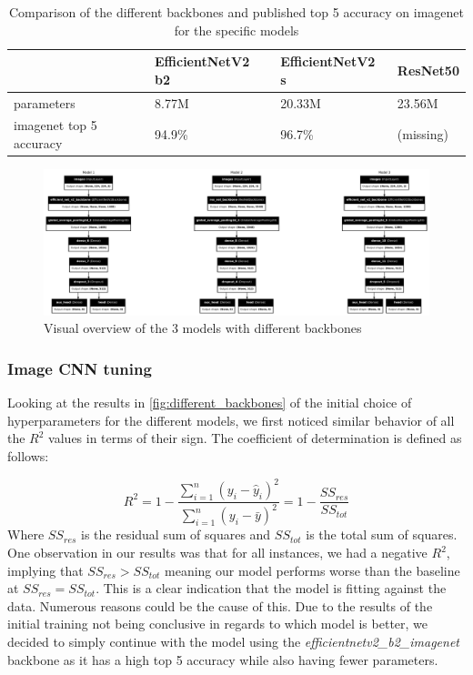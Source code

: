 \documentclass[12pt,a4paper,oneside]{article}
\begin{document}
\begin{table}[!h]
    \centering
    \begin{tabular}{@{}llll@{}}
    \toprule
    & EfficientNetV2 b2 & EfficientNetV2 s & ResNet50 \\ \midrule
    parameters              & 8.77M             & 20.33M           & 23.56M   \\
    imagenet top 5 accuracy & 94.9\%            & 96.7\%           & (missing)       \\ \bottomrule
\end{tabular}
\caption{Comparison of the different backbones and published top 5 accuracy on imagenet for the specific models}
\label{tab:backbone_comparison}
\end{table}

\begin{figure}[!h]
    \centering
    \includegraphics[width=1\textwidth]{assets/different_models.png}
    \caption{Visual overview of the 3 models with different backbones}
    \label{fig:models_overview}
\end{figure}

\subsubsection{Image CNN tuning}

Looking at the results in \ref{fig:different_backbones} of the initial choice of hyperparameters for the different models, we first noticed similar behavior of all the $R^2$ values in terms of their sign. The coefficient of determination is defined as follows:

\[
    R^2 = 1 - \frac{\sum_{i=1}^{n} (y_i - \hat{y}_i)^2}{\sum_{i=1}^{n} (y_i - \bar{y})^2} = 1 - \frac{SS_{res}}{SS_{tot}}  
\]
Where $SS_{res}$ is the residual sum of squares and $SS_{tot}$ is the total sum of squares. One observation in our results was that for all instances, we had a negative $R^2$, implying that $SS_{res} > SS_{tot}$ meaning our model performs worse than the baseline at $SS_{res} = SS_{tot}$. This is a clear indication that the model is fitting against the data. Numerous reasons could be the cause of this. Due to the results of the initial training not being conclusive in regards to which model is better, we decided to simply continue with the model using the \textit{efficientnetv2\_b2\_imagenet} backbone as it has a high top 5 accuracy while also having fewer parameters.
\end{document}
